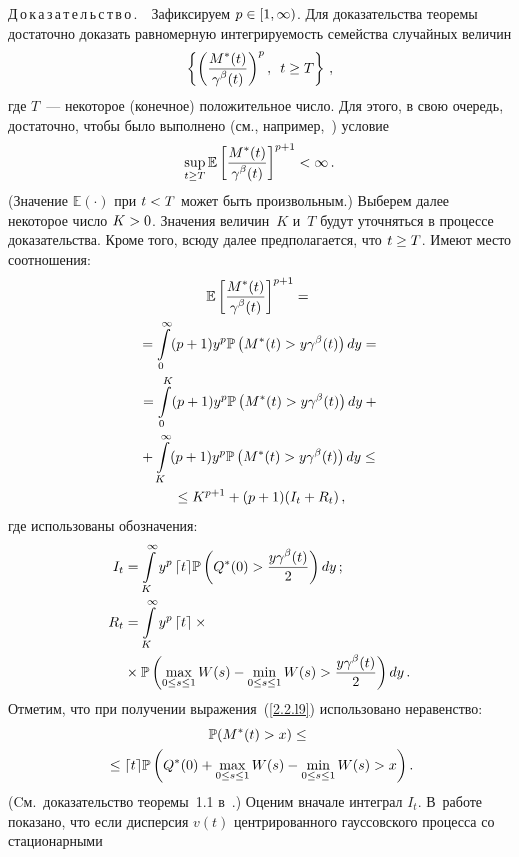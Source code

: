\begin{multicols}{2}
\noindent
Д\,о\,к\,а\,з\,а\,т\,е\,л\,ь\,с\,т\,в\,о\,.\ \ 
Зафиксируем $p \hm\in [1,\infty)$. Для доказательства теоремы
достаточно доказать равномерную интегрируемость семейства случайных величин
$$
\left\{\left(\displaystyle\frac{\displaystyle  M^*(t)\mathstrut}{\displaystyle \gamma^\beta(t)\mathstrut}\right)^p,\enskip t\ge
T\right\}\,,
$$
где $T$~--- некоторое (конечное) положительное чис\-ло. Для этого, в
свою очередь, достаточно, чтобы было выполнено (см., например,~\cite{Billingsley}) условие
\begin{equation}
\label{2.2.l1} 
\sup\limits_{t \geq T} \mathbb{E} \left[
\displaystyle\frac{\displaystyle M^*(t)\mathstrut}{\displaystyle \gamma^\beta(t)\mathstrut} \right]^{p+1} < \infty\,.
\end{equation}
 (Значение $\mathbb{E}(\cdot)$ при $t\hm<T$
может быть произвольным.) Выберем далее некоторое число $K\hm>0$.
Значения величин~$K$ и~$T$ будут уточняться в процессе
доказательства. Кроме того, всюду далее предполагается, что $t\hm\ge
T$. Имеют место  соотношения:
\begin{multline}
\mathbb{E} \left[ \displaystyle\frac{\displaystyle M^*(t)\mathstrut}{\displaystyle \gamma^\beta(t)\mathstrut}\right]^{p+1} = {}\\
{}=
\int\limits_{0}^\infty (p+1)y^p \mathbb{P}\left(M^*(t)>y \gamma^\beta(t)\right)dy={}\\
{}= \int\limits_{0}^K (p+1)y^p \mathbb{P}\left(M^*(t)>y \gamma^\beta(t)\right)dy+{}\\
{}+\int\limits_{K}^\infty (p+1)y^p \mathbb{P}\left(M^*(t)>y \gamma^\beta(t)\right)dy \leq{} \\
{}\leq K^{p+1} + (p+1)(I_t+R_t)\,,\label{2.2.l9}
\end{multline}
где использованы обозначения:
\begin{align*}
I_t&=\int\limits_{K}^\infty y^p \,\lceil t\rceil\mathbb{P}\left(Q^*(0)>\displaystyle\frac{\displaystyle y
\gamma^\beta(t)\mathstrut}{\displaystyle 2\mathstrut}\right)dy\,;\\
 R_t&=\int\limits_{K}^\infty y^p\, \lceil t \rceil \times{}\\
& {}\times \mathbb{P}\left(
 \max\limits_{0\leq s \leq 1}W(s)-\min\limits_{0 \leq s \leq 1}W(s)>\displaystyle\frac{\displaystyle y
\gamma^\beta(t)\mathstrut}{\displaystyle 2\mathstrut}\right)dy\,.
\end{align*}
Отметим, что при получении выражения~(\ref{2.2.l9})
использовано неравенство:
\begin{multline*}
\mathbb{P}(M^*(t)>x) \le {}\\
{}\le \lceil t\rceil\mathbb{P}\left(Q^*(0)+
\max\limits_{0 \leq s \leq 1}W(s)-\min\limits_{0 \leq s \leq 1} W(s)>x\right).
\end{multline*}
(Cм.\ доказательство теоремы~1.1 в~\cite{Lukashenko}.) Оценим вначале
 интеграл $I_t$.
 В~работе~\cite{Duffy} показано, что если дисперсия $v(t)$
 центрированного гауссовского процесса со стационарными

\end{multicols}

